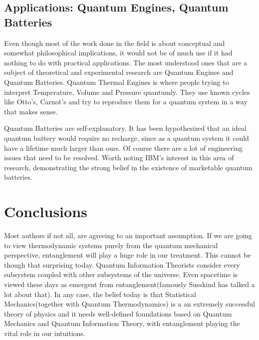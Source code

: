 \documentclass[a4paper,12pt]{article}
\begin{document}
\subsection*{Applications: Quantum Engines, Quantum Batteries}
Even though most of the work done in the field is about conceptual and somewhat philosophical implications, it would not be of much use if it had nothing to do with practical applications. The most understood ones that are a subject of theoretical and experimental research are Quantum Engines and Quantum Batteries. Quantum Thermal Engines is where people trying to interpret Temperature, Volume and Pressure quantumly. They use known cycles like Otto's, Carnot's and try to reproduce them for a quantum system in a way that makes sense.\par Quantum Batteries are self-explanatory. It has been hypothesized that an ideal quantum battery would require no recharge, since as a quantum system it could have a lifetime much larger than ours. Of course there are a lot of engineering issues that need to be resolved. Worth noting IBM's interest in this area of research, demonstrating the strong belief in the existence of marketable quantum batteries.


\section{Conclusions}
Most authors if not all, are agreeing to an important assumption. If we are going to view thermodynamic systems purely  from the quantum mechanical perspective, entanglement will play a huge role in our treatment. This cannot be though that surprising today. Quantum Information Theorists consider every subsystem coupled with other subsystems of the universe. Even spacetime is viewed these days as emergent from entanglement(famously Susskind has talked a lot about that).
In any case, the belief today is that Statistical Mechanics(together with Quantum Thermodynamics) is a an extremely successful theory of physics and it needs well-defined foundations based on Quantum Mechanics and Quantum Information Theory, with entanglement playing the vital role in our intuitions.





\end{document}
